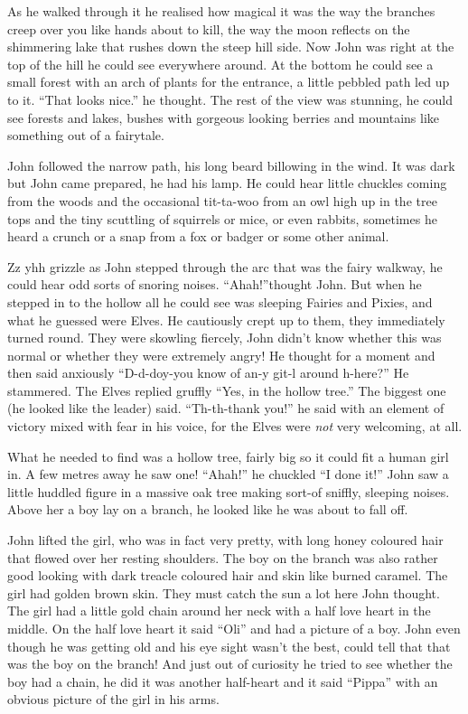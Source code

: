 As he walked through it he realised how magical it was the way the
branches creep over you like hands about to kill, the way the moon
reflects on the shimmering lake that rushes down the steep hill side.
Now John was right at the top of the hill he could see everywhere
around. At the bottom he could see a small forest with an arch of plants
for the entrance, a little pebbled path led up to it. ``That looks
nice.'' he thought. The rest of the view was stunning, he could see
forests and lakes, bushes with gorgeous looking berries and mountains
like something out of a fairytale.

John followed the narrow path, his long beard billowing in the wind. It
was dark but John came prepared, he had his lamp. He could hear little
chuckles coming from the woods and the occasional tit-ta-woo from an owl
high up in the tree tops and the tiny scuttling of squirrels or mice, or
even rabbits, sometimes he heard a crunch or a snap from a fox or badger
or some other animal.

Zz yhh grizzle as John stepped through the arc that was the fairy
walkway, he could hear odd sorts of snoring noises. ``Ahah!''thought
John. But when he stepped in to the hollow all he could see was sleeping
Fairies and Pixies, and what he guessed were Elves. He cautiously crept
up to them, they immediately turned round. They were skowling fiercely,
John didn't know whether this was normal or whether they were extremely
angry! He thought for a moment and then said anxiously ``D-d-doy-you
know of an-y git-l around h-here?'' He stammered. The Elves replied
gruffly ``Yes, in the hollow tree.'' The biggest one (he looked like the
leader) said. ``Th-th-thank you!'' he said with an element of victory
mixed with fear in his voice, for the Elves were \emph{not} very
welcoming, at all.

What he needed to find was a hollow tree, fairly big so it could fit a
human girl in. A few metres away he saw one! ``Ahah!'' he chuckled ``I
done it!'' John saw a little huddled figure in a massive oak tree making
sort-of sniffly, sleeping noises. Above her a boy lay on a branch, he
looked like he was about to fall off.

John lifted the girl, who was in fact very pretty, with long honey
coloured hair that flowed over her resting shoulders. The boy on the
branch was also rather good looking with dark treacle coloured hair and
skin like burned caramel. The girl had golden brown skin. They must
catch the sun a lot here John thought. The girl had a little gold chain
around her neck with a half love heart in the middle. On the half love
heart it said ``Oli'' and had a picture of a boy. John even though he
was getting old and his eye sight wasn't the best, could tell that that
was the boy on the branch! And just out of curiosity he tried to see
whether the boy had a chain, he did it was another half-heart and it
said ``Pippa'' with an obvious picture of the girl in his arms.

